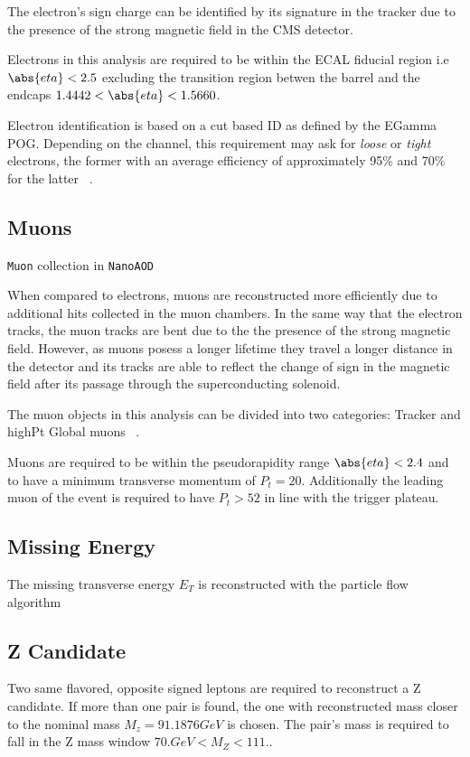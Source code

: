 The electron's sign charge can be identified by its signature in the tracker
due to the presence of the strong magnetic field in the CMS detector.

Electrons in this analysis are required to be within the ECAL fiducial
region i.e $\abs{eta}<2.5$ excluding the transition region betwen the
barrel and the endcaps $1.4442<\abs{eta}<1.5660$.

Electron identification is based on a cut based ID as defined by the
EGamma POG. Depending on the channel, this requirement
may ask for \emph{loose} or \emph{tight} electrons, the former with an
average efficiency of approximately 95\% and 70\% for
the latter ~\cite{EGammaPOG_el}.

\subsection{Muons}

\verb|Muon| collection in \verb|NanoAOD|

When compared to electrons, muons are reconstructed more efficiently due to
additional hits collected in the muon chambers.
In the same way that the electron tracks, the muon tracks are bent due to the
the presence of the strong magnetic field. However, as
muons posess a longer lifetime they travel a longer distance in the detector and
its tracks are able to reflect the change of sign in the magnetic field after
its passage through the superconducting solenoid.

The muon objects in this analysis can be divided into two categories:
Tracker and highPt Global muons ~\cite{MuonPOG}.

Muons are required to be within the pseudorapidity range $\abs{eta}<2.4$ and
to have a minimum transverse momentum of $P_t=20$. Additionally the leading muon of
the event is required to have $P_t>52$ in line with the trigger plateau.

\subsection{Missing Energy}

The missing transverse energy $E_T$ is reconstructed with the particle flow
algorithm ~\cite{particleflow}

\subsection{Z Candidate}

Two same flavored, opposite signed leptons are required to reconstruct a Z
candidate. If more than one pair is found, the one with reconstructed mass
closer to the nominal mass $M_z= 91.1876 GeV$ is chosen. The pair's mass
is required to fall in the Z mass window $ 70. GeV < M_Z < 111. $.


